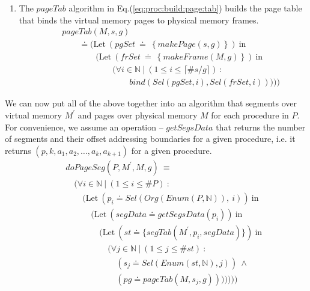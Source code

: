 \documentclass[draft]{article}
\def\names{\doteq}
\begin{document}
\begin{enumerate}
\item  The  $pageTab$  algorithm in  Eq.(\ref{eq:proc:build:page:tab})
  builds  the  page table  that  binds  the  virtual memory  pages  to
  physical memory  frames.
  \begin{eqnarray}
    \label{eq:proc:build:page:tab}
    &~&
    pageTab (M, s, g)
    \nonumber \\
    &~& \quad \quad  
    \names \biggl(
    \mathrm{Let}\ (pgSet\ \names\ \left\{makePage(s, g)\right\})\
    \mathrm{in} 
    \nonumber \\
    &~& \quad \quad \quad \quad
    \bigl(\mathrm{Let}\ (frSet\ \names\ \left\{makeFrame(M,
      g)\right\})\ \mathrm{in} 
    \nonumber \\
    &~& \quad \quad \quad \quad \quad \quad
    \bigl(\forall i \in \mathbb{N}\ \vert\ (1 \le i \le \lceil \#s/g
    \rceil)\ :
    \nonumber \\
    &~& \quad \quad \quad \quad \quad \quad \quad \quad
    bind (Sel(pgSet, i), Sel(frSet, i)) 
    \bigr)\bigr)\biggr)
  \end{eqnarray}
\end{enumerate}

We  can now  put all  of  the above  together into  an algorithm  that
segments over virtual memory $M^\prime$ and pages over physical memory
$M$  for  each  procedure  in  $P$.  For  convenience,  we  assume  an
operation  -- $getSegsData$ that  returns the  number of  segments and
their  offset addressing  boundaries for  a given  procedure,  i.e. it
returns  $(p,  k,  a_1,  a_2,  \ldots,  a_k,  a_{k+1})$  for  a  given
procedure.
\begin{eqnarray}
  \label{eq:full:seg:pg:algo}
  &~&
  doPageSeg(P, M^\prime, M, g)\ \equiv
  \nonumber \\
  &~& \quad
  \biggl(
  \forall i \in \mathbb{N}\ \vert\ (1 \le i \le \#P)\ :\ 
  \nonumber \\
  &~& \quad \quad 
  (\mathrm{Let}\ (p_i \names Sel(Org(Enum(P, \mathbb{N})),\ i))\
  \mathrm{in} 
  \nonumber \\
  &~& \quad \quad \quad
  (\mathrm{Let}\ (segData \names getSegsData(p_i))\ \mathrm{in} 
  \nonumber \\
  &~& \quad \quad \quad \quad 
  (\mathrm{Let}\ (st \names \{segTab(M^\prime, p_i, segData)\})\
  \mathrm{in}  
  \nonumber \\
  &~& \quad \quad \quad \quad \quad 
  (\forall j \in \mathbb{N}\ \vert\ (1 \le j \le \#st)\ :
  \nonumber \\
  &~& \quad \quad \quad \quad \quad \quad
  (s_j \names Sel(Enum(st, \mathbb{N}), j))\ \wedge\ 
  \nonumber \\
  &~& \quad \quad \quad \quad \quad \quad
  (pg \names pageTab(M, s_j, g))
  ))))\biggr)
\end{eqnarray}
\end{document}
